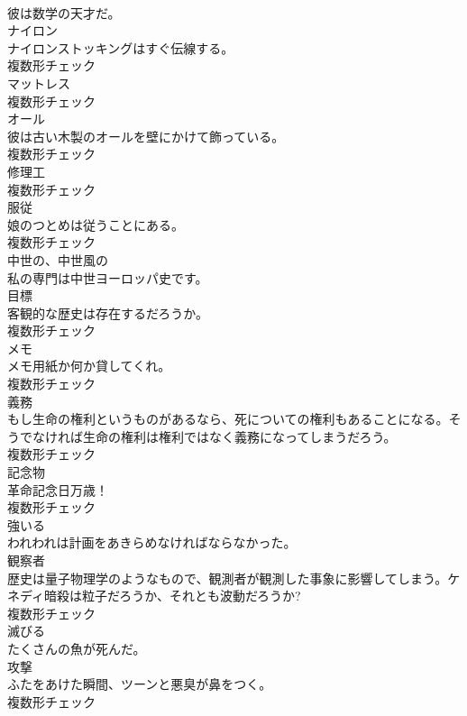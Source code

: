 \documentclass[8pt]{extreport}
\begin{document}
\begin{CJK}{UTF8}{min}
\\	彼は数学の天才だ。	
\\	[名詞]	ナイロン	
\\	ナイロンストッキングはすぐ伝線する。	
\\	複数形チェック
\\	[名詞]	マットレス	
\\	複数形チェック
\\	[名詞]	オール	
\\	彼は古い木製のオールを壁にかけて飾っている。	
\\	複数形チェック
\\	[名詞]	修理工	
\\	複数形チェック
\\	[名詞]	服従	
\\	娘のつとめは従うことにある。	
\\	複数形チェック
\\	[形容詞]	中世の、中世風の	
\\	私の専門は中世ヨーロッパ史です。	
\\	[名詞]	目標	
\\	客観的な歴史は存在するだろうか。	
\\	複数形チェック
\\	[名詞]	メモ	
\\	メモ用紙か何か貸してくれ。	
\\	複数形チェック
\\	[名詞]	義務	
\\	もし生命の権利というものがあるなら、死についての権利もあることになる。そうでなければ生命の権利は権利ではなく義務になってしまうだろう。	
\\	複数形チェック
\\	[名詞]	記念物	
\\	革命記念日万歳！	
\\	複数形チェック
\\	[動詞]	強いる	
\\	われわれは計画をあきらめなければならなかった。	
\\	[名詞]	観察者	
\\	歴史は量子物理学のようなもので、観測者が観測した事象に影響してしまう。ケネディ暗殺は粒子だろうか、それとも波動だろうか?	
\\	複数形チェック
\\	[動詞]	滅びる	
\\	たくさんの魚が死んだ。	
\\	[名詞]	攻撃	
\\	ふたをあけた瞬間、ツーンと悪臭が鼻をつく。	
\\	複数形チェック

\end{CJK}
\end{document}
